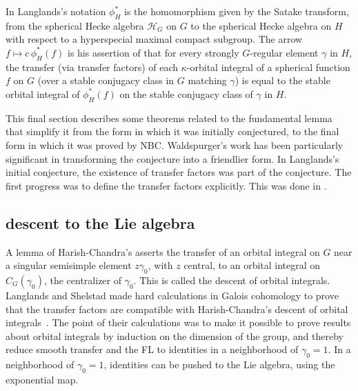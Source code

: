 \documentclass[brochure,english,12pt]{bourbaki}
\begin{document}
In Langlands's notation $\phi_H^*$ is the homomorphism given by the
Satake transform, from the spherical Hecke algebra ${\mathcal H}_G$ on
$G$ to the spherical Hecke algebra on $H$ with respect to a hyperspecial maximal compact
subgroup.  The arrow $f\mapsto
c\,\phi_H^*(f)$ is his assertion of that for every strongly $G$-regular element $\gamma$
in $H$, the transfer (via transfer factors) of each $\kappa$-orbital integral
of a spherical function $f$ on $G$ (over a stable conjugacy class in $G$ matching $\gamma$) is
equal to the stable orbital integral of $\phi_H^*(f)$ on the stable conjugacy class of $\gamma$ in $H$.

This final section describes some theorems related to the fundamental
lemma that simplify it from the form in which it was initially
conjectured, to the final form in which it was proved by NBC.
Waldspurger's work has been particularly significant in transforming the conjecture into a 
friendlier form.  In Langlands's
initial conjecture, the existence of transfer factors was part of the conjecture.
The first progress was to define the transfer factors explicitly.  
This was done in \cite{LS:1987}.



\subsection{descent to the Lie algebra}\label{sec:descent}

A lemma of Harish-Chandra's asserts the transfer of an orbital
integral on $G$ near a singular semisimple element $z\gamma_0$, with
$z$ central, to an orbital integral on $C_G(\gamma_0)$, the
centralizer of $\gamma_0$.  This is called the descent of orbital
integrals.  Langlands and Shelstad made hard calculations in
Galois cohomology to prove that the transfer factors are compatible
with Harish-Chandra's descent of orbital integrals~\cite{LS:1990}.  The point of
their calculations was to make it possible to prove results about
orbital integrals by induction on the dimension of the group, and
thereby reduce smooth transfer and the FL to identities
in a neighborhood of $\gamma_0=1$.  In a neighborhood of $\gamma_0=1$,
identities can be pushed to the Lie algebra, using the exponential map.
\end{document}
